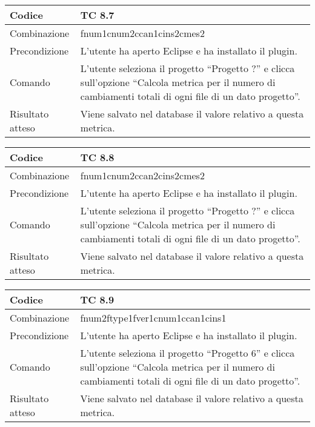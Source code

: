 \begin{table}[ht]
\begin{tabular}{|p{3cm}|p{9cm}|}
\hline
\cellcolor{lightgray}Codice				& TC 8.7								\\
\hline
\cellcolor{lightgray}Combinazione		& fnum1cnum2ccan1cins2cmes2									\\
\hline
\cellcolor{lightgray}Precondizione		& L'utente ha aperto Eclipse e ha installato il plugin.		\\
\hline
\cellcolor{lightgray}Comando			& L'utente seleziona il progetto ``Progetto ?''  e clicca sull'opzione ``Calcola metrica per il numero di cambiamenti totali di ogni file di un dato progetto''.	\\
\hline
\cellcolor{lightgray}Risultato atteso	& Viene salvato nel database il valore relativo a questa metrica.\\
\hline
\end{tabular}
\end{table}

\begin{table}[ht]
\begin{tabular}{|p{3cm}|p{9cm}|}
\hline
\cellcolor{lightgray}Codice				& TC 8.8								\\
\hline
\cellcolor{lightgray}Combinazione		& fnum1cnum2ccan2cins2cmes2									\\
\hline
\cellcolor{lightgray}Precondizione		& L'utente ha aperto Eclipse e ha installato il plugin.		\\
\hline
\cellcolor{lightgray}Comando			& L'utente seleziona il progetto ``Progetto ?''  e clicca sull'opzione ``Calcola metrica per il numero di cambiamenti totali di ogni file di un dato progetto''.	\\
\hline
\cellcolor{lightgray}Risultato atteso	& Viene salvato nel database il valore relativo a questa metrica.\\
\hline
\end{tabular}
\end{table}

\begin{table}[ht]
\begin{tabular}{|p{3cm}|p{9cm}|}
\hline
\cellcolor{lightgray}Codice				& TC 8.9								\\
\hline
\cellcolor{lightgray}Combinazione		& fnum2ftype1fver1cnum1ccan1cins1									\\
\hline
\cellcolor{lightgray}Precondizione		& L'utente ha aperto Eclipse e ha installato il plugin.		\\
\hline
\cellcolor{lightgray}Comando			& L'utente seleziona il progetto ``Progetto 6''  e clicca sull'opzione ``Calcola metrica per il numero di cambiamenti totali di ogni file di un dato progetto''.	\\
\hline
\cellcolor{lightgray}Risultato atteso	& Viene salvato nel database il valore relativo a questa metrica.\\
\hline
\end{tabular}
\end{table}

